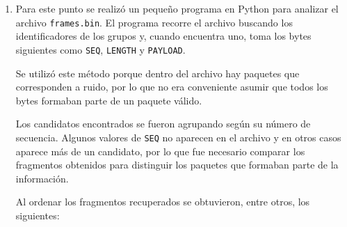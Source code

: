 \documentclass[11pt,a4paper]{article}
\begin{document}
\begin{enumerate}[label=\arabic*)]
\begin{enumerate}[label=\alph*)]
          \[
            \texttt{6E\ 65\ 74\ 72\ 75\ 13\ 02\ 74\ 73}
          \]

          En este caso, el byte \texttt{13} corresponde al campo \texttt{SEQ}.
          Realizando la misma conversión:

          \[
            \texttt{0x13}=1\cdot16+3=19
          \]

          por lo que:

          \[
            \texttt{SEQ}=19
          \]

          El valor \texttt{02} indica que el payload tiene una longitud de dos
          bytes. Los bytes \texttt{74\ 73} corresponden a los caracteres
          \texttt{ts}.

          Entonces, ordenando los paquetes según su número de secuencia:

          \[
            \texttt{SEQ 18} \rightarrow \texttt{r}
          \]

          \[
            \texttt{SEQ 19} \rightarrow \texttt{ts}
          \]

          Finalmente, concatenando los payloads:

          \[
            \texttt{r}+\texttt{ts}=\boxed{\texttt{rts}}
          \]

          Por lo tanto, la información recuperada para el grupo
          \textbf{NetRunners} es:

          \[
            \boxed{\texttt{rts}}
          \]
          \item
           Para este punto se realizó un pequeño programa en Python para analizar
  el archivo \texttt{frames.bin}. El programa recorre el archivo buscando
  los identificadores de los grupos y, cuando encuentra uno, toma los bytes
  siguientes como \texttt{SEQ}, \texttt{LENGTH} y \texttt{PAYLOAD}.

  Se utilizó este método porque dentro del archivo hay paquetes que
  corresponden a ruido, por lo que no era conveniente asumir que todos los
  bytes formaban parte de un paquete válido.

  Los candidatos encontrados se fueron agrupando según su número de
  secuencia. Algunos valores de \texttt{SEQ} no aparecen en el archivo y
  en otros casos aparece más de un candidato, por lo que fue necesario
  comparar los fragmentos obtenidos para distinguir los paquetes que
  formaban parte de la información.

  Al ordenar los fragmentos recuperados se obtuvieron, entre otros, los
  siguientes:


\end{enumerate}
\end{enumerate}
\end{document}
